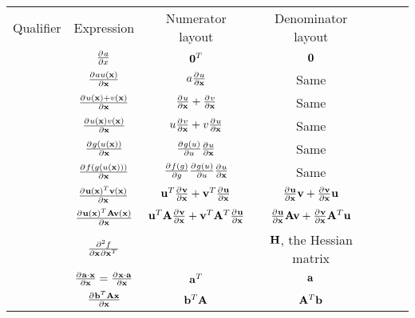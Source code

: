 \begin{center}
\begin{tabular}{l|Sc|Sc|Sc}
Qualifier                  & Expression                                    & Numerator layout                                   & Denominator layout                            \\
                           & $\pd{a}{x}$                                   & $\vzero^T$                                         & $\vzero$                                      \\
                           & $\pd{au(\vx)}{\vx}$                           & $a\pd{u}{\vx}$                                     & Same                                          \\
                           & $\pd{u(\vx)+v(\vx)}{\vx}$                     & $\pd{u}{\vx} + \pd{v}{\vx}$                        & Same                                          \\
                           & $\pd{u(\vx)v(\vx)}{\vx}$                      & $u\pd{v}{\vx} + v\pd{u}{\vx}$                      & Same                                          \\
                           & $\pd{g(u(\vx))}{\vx}$                         & $\pd{g(u)}{u}\pd{u}{\vx}$                          & Same                                          \\
                           & $\pd{f(g(u(\vx)))}{\vx}$                      & $\pd{f(g)}{g}\pd{g(u)}{u}\pd{u}{\vx}$              & Same                                          \\
                           & $\pd{\vu(\vx)^T\vv(\vx)}{\vx}$                & $\vu^T\pd{\vv}{\vx}+\vv^T\pd{\vu}{\vx}$            & $\pd{\vu}{\vx}\vv+\pd{\vv}{\vx}\vu$           \\
                           & $\pd{\vu(\vx)^T\mA\vv(\vx)}{\vx}$             & $\vu^T\mA\pd{\vv}{\vx}+\vv^T\mA^T\pd{\vu}{\vx}$    & $\pd{\vu}{\vx}\mA\vv+\pd{\vv}{\vx}\mA^T\vu$   \\
                           & $\md{f}{2}{\vx}{}{{\vx^T}}{}$                 &                                                    & $\mH$, the Hessian matrix                     \\
                           & $\pd{\va\cdot\vx}{\vx}=\pd{\vx\cdot\va}{\vx}$ & $\va^T$                                            & $\va$                                         \\
                           & $\pd{\vb^T\mA\vx}{\vx}$                       & $\vb^T\mA$                                         & $\mA^T\vb$                                    \\

\end{tabular}
\end{center}
